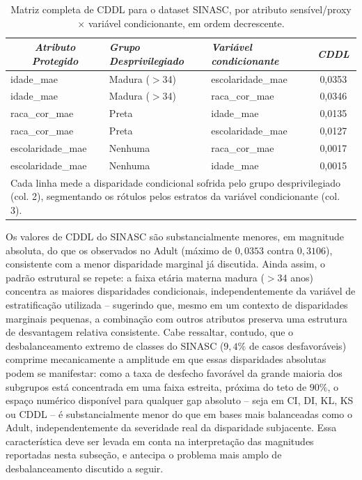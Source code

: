 \begin{table}[H]
    \centering
    \small
    \caption{Matriz completa de CDDL para o dataset SINASC, por atributo sensível/proxy $\times$ variável condicionante, em ordem decrescente.}
    \vspace{2mm}
    \begin{tabular}{lll|c}
        \hline
        \multicolumn{1}{c}{\textit{Atributo Protegido}} & \textit{Grupo Desprivilegiado} & \textit{Variável condicionante} & \textit{CDDL} \\
        \hline
        idade\_mae        & Madura ($>$34) & escolaridade\_mae & 0,0353 \\
        idade\_mae        & Madura ($>$34) & raca\_cor\_mae    & 0,0346 \\
        raca\_cor\_mae    & Preta          & idade\_mae        & 0,0135 \\
        raca\_cor\_mae    & Preta          & escolaridade\_mae & 0,0127 \\
        escolaridade\_mae & Nenhuma        & raca\_cor\_mae    & 0,0017 \\
        escolaridade\_mae & Nenhuma        & idade\_mae        & 0,0015 \\
        \hline
        \multicolumn{4}{p{0.85\textwidth}}{\footnotesize Cada linha mede a disparidade condicional sofrida pelo grupo desprivilegiado (col. 2), segmentando os rótulos pelos estratos da variável condicionante (col. 3).}
    \end{tabular}
    \label{tab:sinasc_cddl}
\end{table}

Os valores de CDDL do SINASC são substancialmente menores, em magnitude absoluta, do que os observados no Adult (máximo de $0,0353$ contra $0,3106$), consistente com a menor disparidade marginal já discutida. Ainda assim, o padrão estrutural se repete: a faixa etária materna madura ($>$34 anos) concentra as maiores disparidades condicionais, independentemente da variável de estratificação utilizada -- sugerindo que, mesmo em um contexto de disparidades marginais pequenas, a combinação com outros atributos preserva uma estrutura de desvantagem relativa consistente. Cabe ressaltar, contudo, que o desbalanceamento extremo de classes do SINASC ($9,4\%$ de casos desfavoráveis) comprime mecanicamente a amplitude em que essas disparidades absolutas podem se manifestar: como a taxa de desfecho favorável da grande maioria dos subgrupos está concentrada em uma faixa estreita, próxima do teto de $90\%$, o espaço numérico disponível para qualquer gap absoluto -- seja em CI, DI, KL, KS ou CDDL -- é substancialmente menor do que em bases mais balanceadas como o Adult, independentemente da severidade real da disparidade subjacente. Essa característica deve ser levada em conta na interpretação das magnitudes reportadas nesta subseção, e antecipa o problema mais amplo de desbalanceamento discutido a seguir.

